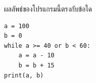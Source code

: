 \question ผลลัพธ์ของโปรแกรมนี้ตรงกับข้อใด
\begin{verbatim}
a = 100
b = 0
while a >= 40 or b < 60:
    a = a - 10
    b = b + 15
print(a, b)
\end{verbatim}
